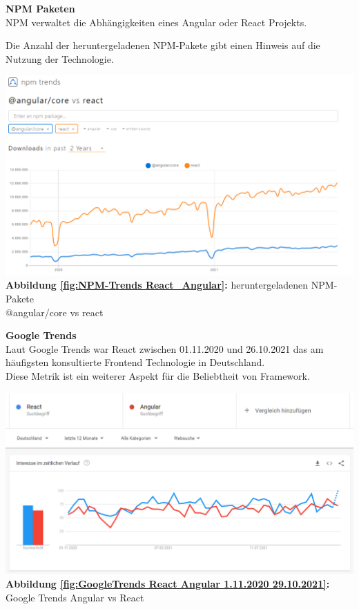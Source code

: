 {\cite{GH04, GH06}}%


\textbf{NPM Paketen}\\
NPM verwaltet die Abhängigkeiten eines Angular oder React Projekts.

Die Anzahl der heruntergeladenen NPM-Pakete gibt einen Hinweis auf die Nutzung der Technologie.

\begin{center}
  \includegraphics[scale=0.4]
  {sources/NPM-Trends React_Angular}\label{fig:NPM-Trends React_Angular}\\
  \textbf{Abbildung \autoref{fig:NPM-Trends React_Angular}:} heruntergeladenen NPM-Pakete \\@angular/core vs react
    {\cite{NPM01}}
\end{center}

\newpage

\textbf{Google Trends}\\
Laut Google Trends war React zwischen 01.11.2020 und 26.10.2021 das am häufigsten konsultierte Frontend Technologie in Deutschland.
\\
Diese Metrik ist ein weiterer Aspekt für die Beliebtheit von Framework.
\begin{center}
  \includegraphics[scale=0.5]
  {sources/GoogleTrends React Angular 1.11.2020 29.10.2021}\label{fig:GoogleTrends React Angular 1.11.2020 29.10.2021}\\
  \textbf{Abbildung \autoref{fig:GoogleTrends React Angular 1.11.2020 29.10.2021}:} Google Trends Angular vs React 
    {\cite{GO01}}
\end{center}

